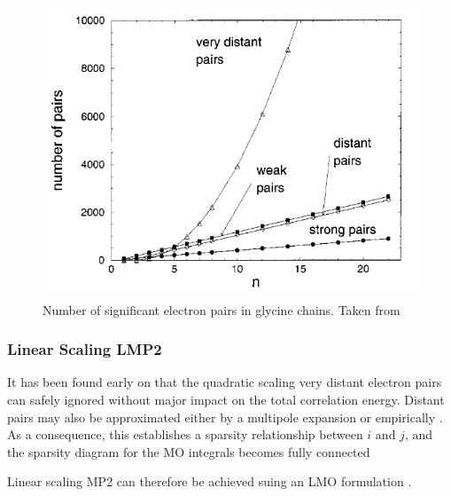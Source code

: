 \begin{figure}
\centering
\includegraphics[scale=0.5]{Pics/electron_pairs.png}
\caption{Number of significant electron pairs in glycine chains. Taken from \cite{Sch1999}}
\end{figure}

\subsubsection{Linear Scaling LMP2}

It has been found \cite{Sae1987} early on that the quadratic scaling very distant electron pairs can safely ignored without major impact on the total correlation energy. Distant pairs may also be approximated either by a multipole expansion \cite{Het1998} or empirically \cite{Rau1995}. As a consequence, this establishes a sparsity relationship between $i$ and $j$, and the sparsity diagram for the MO integrals becomes fully connected
\begin{center}
\end{center}
\noindent Linear scaling MP2 can therefore be achieved suing an LMO formulation \cite{Sch1999}.

